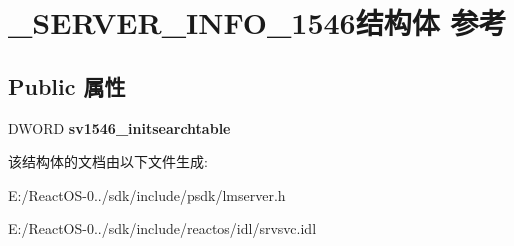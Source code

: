 \hypertarget{struct___s_e_r_v_e_r___i_n_f_o__1546}{}\section{\+\_\+\+S\+E\+R\+V\+E\+R\+\_\+\+I\+N\+F\+O\+\_\+1546结构体 参考}
\label{struct___s_e_r_v_e_r___i_n_f_o__1546}
\subsection*{Public 属性}
\begin{DoxyCompactItemize}
\item 
\mbox{\label{struct___s_e_r_v_e_r___i_n_f_o__1546_a64d81ef12a90710633d9cec609aa3961}} 
D\+W\+O\+RD {\bfseries sv1546\+\_\+initsearchtable}
\end{DoxyCompactItemize}


该结构体的文档由以下文件生成\+:\begin{DoxyCompactItemize}
\item 
E\+:/\+React\+O\+S-\/0../sdk/include/psdk/lmserver.\+h\item 
E\+:/\+React\+O\+S-\/0../sdk/include/reactos/idl/srvsvc.\+idl\end{DoxyCompactItemize}
